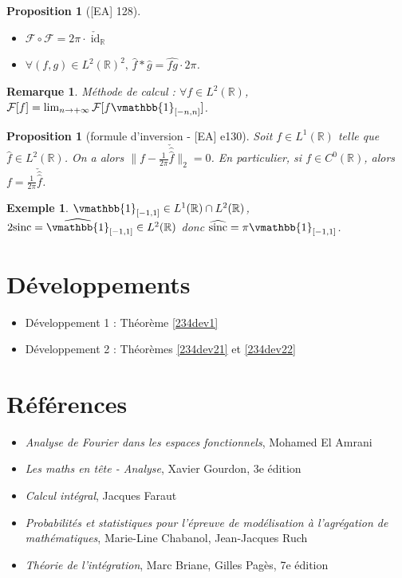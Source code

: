 \documentclass[10pt, a4paper, parskip=full, twoside, twocolumn]{report}
\newtheorem{proposition}[definition]{Proposition}
\newtheorem{example}[definition]{Exemple}
\newtheorem{remark}[definition]{Remarque}
\newcommand{\IR}{\mathbb{R}}
\DeclareMathOperator{\id}{id}
\begin{document}
\begin{proposition}[\textnormal{[EA] 128}]
	\begin{itemize}
		\item $\mathcal{F}\circ\mathcal{F} = 2\pi\cdot \check{\id}_{\IR}$
		\item $\forall(f,g)\in L^2(\IR)^2,\, \hat{f}*\hat{g} = \widehat{fg}\cdot 2\pi$.
	\end{itemize}
\end{proposition}

\begin{remark}
	Méthode de calcul : $\forall f\in L^2(\IR)$, $\mathcal{F}[f] = \lim_{n\to +\infty}\mathcal{F}[f\vmathbb{1}_{[-n,n]}]$.
\end{remark}

\begin{proposition}[formule d'inversion - \textnormal{[EA] e130}]
	Soit $f\in L^1(\IR)$ telle que $\hat{f}\in L^2(\IR)$.
	On a alors $\|f - \frac{1}{2\pi}\check{\hat{\hat{f}}}\|_2 = 0$.
	En particulier, si $f\in C^0(\IR)$, alors $f = \frac{1}{2\pi}\check{\hat{\hat{f}}}$.
\end{proposition}

\begin{example}
	$\vmathbb{1}_{[-1,1]}\in L^1(\IR)\cap L^2(\IR)$, $2\textnormal{sinc} = \widehat{\vmathbb{1}}_{[-1,1]}\in L^2(\IR)$ donc $\widehat{\textnormal{sinc}} = \pi\vmathbb{1}_{[-1,1]}$.
\end{example}

\section*{Développements}
\begin{itemize}
	\item Développement 1 : Théorème \ref{234dev1}
	\item Développement 2 : Théorèmes \ref{234dev21} et \ref{234dev22}
\end{itemize}

\section*{Références}
\begin{itemize}	
	\item[EA] \emph{Analyse de Fourier dans les espaces fonctionnels}, Mohamed El Amrani
	\item[G] \emph{Les maths en tête - Analyse}, Xavier Gourdon, 3e édition 
	\item[F] \emph{Calcul intégral}, Jacques Faraut
	\item[CR] \emph{Probabilités et statistiques pour l'épreuve de modélisation à l'agrégation de mathématiques}, Marie-Line Chabanol, Jean-Jacques Ruch
	\item[BP] \emph{Théorie de l'intégration}, Marc Briane, Gilles Pagès, 7e édition
\end{itemize}
\end{document}
